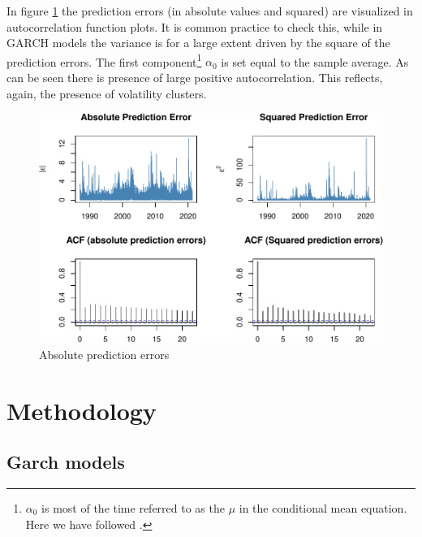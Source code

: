 \documentclass[a4paper, nobind]{templates/ociamthesis}
\begin{document}
\noindent In figure \ref{fig:acfplots} the prediction errors (in absolute values and squared) are visualized in autocorrelation function plots. It is common practice to check this, while in GARCH models the variance is for a large extent driven by the square of the prediction errors. The first component\footnote{\(\alpha_0\) is most of the time referred to as the \(\mu\) in the conditional mean equation. Here we have followed \textcite{bali2008}.} \(\alpha_0\) is set equal to the sample average. As can be seen there is presence of large positive autocorrelation. This reflects, again, the presence of volatility clusters.

\begin{figure}[h]

{\centering \includegraphics[width=1\linewidth]{_main_files/figure-latex/acfplots-1} 

}

\caption{Absolute prediction errors}\label{fig:acfplots}
\end{figure}

\clearpage

\hypertarget{methodology}{%
\section{Methodology}\label{methodology}}

\hypertarget{garch-method}{%
\subsection{Garch models}\label{garch-method}}
\end{document}
